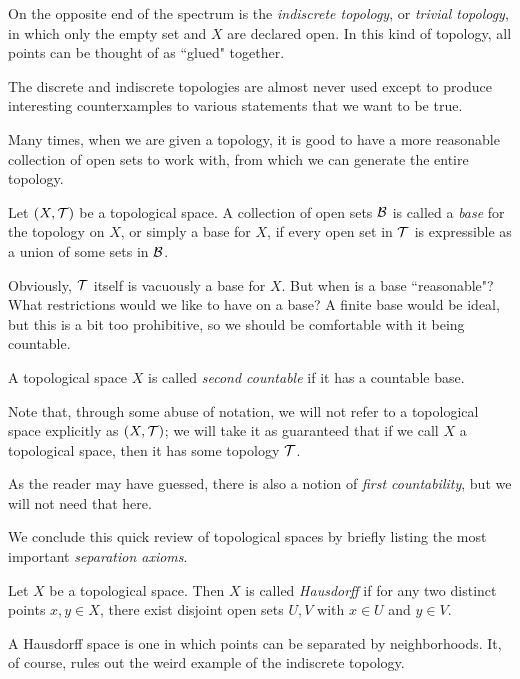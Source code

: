 On the opposite end of the spectrum is the \emph{indiscrete topology}, or \emph{trivial topology}, in which only the empty set and $X$ are declared open. In this kind of topology, all points can be thought of as ``glued" together.

The discrete and indiscrete topologies are almost never used except to produce interesting counterxamples to various statements that we want to be true.

Many times, when we are given a topology, it is good to have a more reasonable collection of open sets to work with, from which we can generate the entire topology.

\begin{definition}
	Let $(X,\mathcal{T})$ be a topological space. A collection of open sets $\mathcal{B}$ is called a \emph{base} for the topology on $X$, or simply a base for $X$, if every open set in $\mathcal{T}$ is expressible as a union of some sets in $\mathcal{B}$.
\end{definition}

Obviously, $\mathcal{T}$ itself is vacuously a base for $X$. But when is a base ``reasonable"? What restrictions would we like to have on a base? A finite base would be ideal, but this is a bit too prohibitive, so we should be comfortable with it being countable.

\begin{definition}
	A topological space $X$ is called \emph{second countable} if it has a countable base.
\end{definition}

Note that, through some abuse of notation, we will not refer to a topological space explicitly as $(X,\mathcal{T})$; we will take it as guaranteed that if we call $X$ a topological space, then it has some topology $\mathcal{T}$.

As the reader may have guessed, there is also a notion of \emph{first countability}, but we will not need that here.

We conclude this quick review of topological spaces by briefly listing the most important \textit{separation axioms}.

\begin{definition}
	Let $X$ be a topological space. Then $X$ is called \emph{Hausdorff} if for any two distinct points $x,y \in X$, there exist disjoint open sets $U, V$ with $x \in U$ and $y \in V$.
\end{definition}

A Hausdorff space is one in which points can be separated by neighborhoods. It, of course, rules out the weird example of the indiscrete topology.

